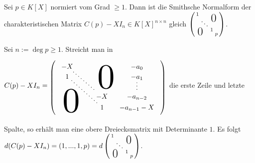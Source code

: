 \documentclass[../../main.tex]{subfiles}
\begin{document}
\begin{lem}\label{17.5.2}
Sei $p\in K[X]$ normiert vom Grad $\ge 1$. Dann ist die Smithsche Normalform der charakteristischen Matrix $C(p)-XI_n\in K[X]^{n\times n}$ gleich $\left(\begin{smallmatrix}
1 & & &\llap{$\overset{\blap{\LARGE 0}}{~}$} \\
& \ddots & &\\
& & 1 &\\
\rlap{\tlap{\LARGE 0}}& & & p
\end{smallmatrix}\right)$.
\end{lem}
\begin{cproof}
Sei $n:=\deg p\ge 1$. Streicht man in $C(p)-XI_n=
\begin{tikzpicture}[loosely dotted,thick,baseline]
\matrix (m) [matrix of math nodes,nodes in empty cells,right delimiter=),left delimiter=(,column sep=1em]{
-X&&&-a_0\\
1&&&-a_1\\
&&&\\
&&&\\
&&-X&-a_{n-2}\\
&&1&-a_{n-1}-X\\
} ;
\node at (m-1-3.south) [anchor=center, xshift=0.2cm,yshift=-0.3cm,  xscale=5, yscale=5] {$0$};
\node at (m-6-1.north) [anchor=center, xshift=0.2cm,yshift=0.3cm,  xscale=5, yscale=5] {$0$};
\draw (m-2-4)-- (m-5-4);
\draw (m-1-1)-- (m-5-3);
\draw (m-2-1)-- (m-6-3);
\end{tikzpicture}$ die erste Zeile und letzte Spalte, so erhält man eine obere Dreiecksmatrix mit Determinante $1$. Es folgt $d(C(p)-XI_n)=(1,...,1,p)=d\left(\begin{smallmatrix}
1 & & &\llap{$\overset{\blap{\LARGE 0}}{~}$} \\
& \ddots & &\\
& & 1 &\\
\rlap{\tlap{\LARGE 0}}& & & p
\end{smallmatrix}\right)$.
\end{cproof}
\end{document}

